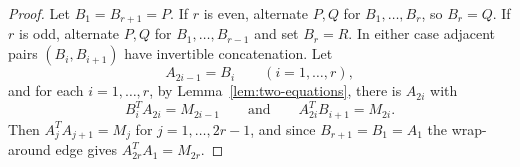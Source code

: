 \documentclass[10pt,a4paper]{amsart}
\begin{document}
\begin{proof}
Let $B_1=B_{r+1}=P$.
If $r$ is even, alternate $P,Q$ for $B_1,
\ldots,B_r$, so $B_r=Q$.
If $r$ is odd, alternate $P,Q$ for $B_1,
\ldots,B_{r-1}$ and set $B_r=R$.
In either case adjacent pairs $(B_i,B_{i+1})$ have invertible concatenation. 
Let 
\[
  A_{2i-1}=B_i\qquad (i=1,\ldots,r),
\]
and for each $i=1,\ldots,r$, by  Lemma~\ref{lem:two-equations}, there is  $A_{2i}$  with
\[
  B_i^T A_{2i}=M_{2i-1}
  \qquad\text{and}\qquad
  A_{2i}^T B_{i+1}=M_{2i}.
\]
Then $A_j^T A_{j+1}=M_j$ for $j=1,\ldots,2r-1$, and since
$B_{r+1}=B_1=A_1$ the wrap-around edge gives
$A_{2r}^T A_1=M_{2r}$.
\end{proof} 
\end{document}
